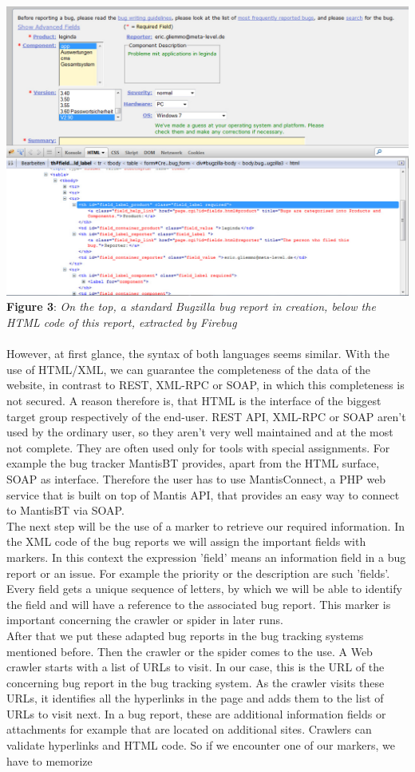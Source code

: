 \\\includegraphics[width=1.0\textwidth]{Screenshot_bugzilla_html2.jpg}  \\\textbf{Figure 3}: \textit{On the top, a standard Bugzilla bug report in creation, below the HTML code of this report, extracted by Firebug}  \\ \\ However, at first glance, the syntax of both languages seems similar. With the use of HTML/XML, we can guarantee the completeness of the data of the website, in contrast to REST, XML-RPC or SOAP, in which this completeness is not secured. A reason therefore is, that HTML is the interface of the biggest target group respectively of the end-user. REST API, XML-RPC or SOAP aren't used by the ordinary user, so they aren't very well maintained and at the most not complete. They are often used only for tools with special assignments. For example the bug tracker MantisBT provides, apart from the HTML surface, SOAP as interface. Therefore the user has to use MantisConnect, a PHP web service that is built on top of Mantis API, that provides an easy way to connect to MantisBT via SOAP.   \\ The next step will be the use of a marker to retrieve our required information. In the XML code of the bug reports we will assign the important fields with markers. In this context the expression 'field' means an information field in a bug report or an issue. For example the priority or the description are such 'fields'. Every field gets a unique sequence of letters, by which we will be able to identify the field and will have a reference to the associated bug report. This marker is important concerning the crawler or spider in later runs. \\After that we put these adapted bug reports in the bug tracking systems mentioned before. Then the crawler or the spider comes to the use. A Web crawler starts with a list of URLs to visit. In our case, this is the URL of the concerning bug report in the bug tracking system. As the crawler visits these URLs, it identifies all the hyperlinks in the page and adds them to the list of URLs to visit next. In a bug report, these are additional information fields or attachments for example that are located on additional sites. Crawlers can validate hyperlinks and HTML code. So if we encounter one of our markers, we have to memorize 